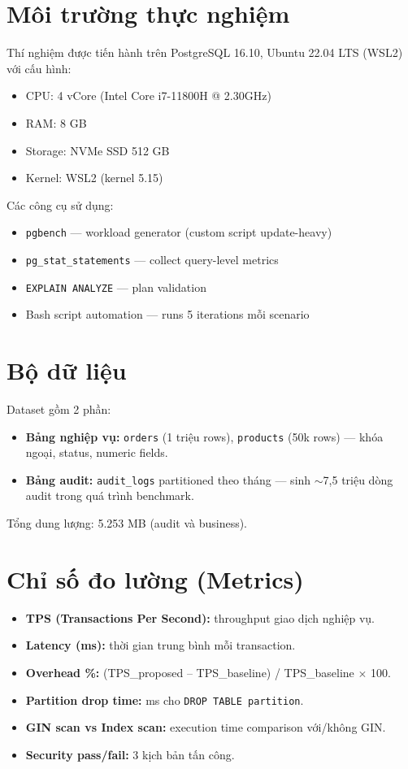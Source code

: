 \section{Môi trường thực nghiệm}

Thí nghiệm được tiến hành trên PostgreSQL 16.10, Ubuntu 22.04 LTS (WSL2) với cấu hình:
\begin{itemize}
    \item CPU: 4 vCore (Intel Core i7-11800H @ 2.30GHz)
    \item RAM: 8 GB
    \item Storage: NVMe SSD 512 GB
    \item Kernel: WSL2 (kernel 5.15)
\end{itemize}

Các công cụ sử dụng:
\begin{itemize}
    \item \texttt{pgbench} --- workload generator (custom script update-heavy)
    \item \texttt{pg\_stat\_statements} --- collect query-level metrics
    \item \texttt{EXPLAIN\ ANALYZE} --- plan validation
    \item Bash script automation --- runs 5 iterations mỗi scenario
\end{itemize}

\section{Bộ dữ liệu}

Dataset gồm 2 phần:
\begin{itemize}
    \item \textbf{Bảng nghiệp vụ:} \texttt{orders} (1 triệu rows), \texttt{products} (50k rows) --- khóa ngoại, status, numeric fields.
    \item \textbf{Bảng audit:} \texttt{audit\_logs} partitioned theo tháng --- sinh $\sim$7,5 triệu dòng audit trong quá trình benchmark.
\end{itemize}

Tổng dung lượng: 5.253 MB (audit và business).

\section{Chỉ số đo lường (Metrics)}

\begin{itemize}
    \item \textbf{TPS (Transactions Per Second):} throughput giao dịch nghiệp vụ.
    \item \textbf{Latency (ms):} thời gian trung bình mỗi transaction.
    \item \textbf{Overhead \%:} (TPS\_proposed -- TPS\_baseline) / TPS\_baseline $\times$ 100.
    \item \textbf{Partition drop time:} ms cho \texttt{DROP\ TABLE\ partition}.
    \item \textbf{GIN scan vs Index scan:} execution time comparison với/không GIN.
    \item \textbf{Security pass/fail:} 3 kịch bản tấn công.
\end{itemize}

